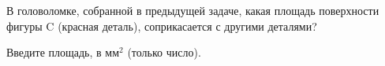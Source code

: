 
В головоломке, собранной в предыдущей задаче, какая площадь поверхности фигуры C (красная деталь), 
соприкасается с другими деталями?


Введите площадь,  в мм$^2$  (только число).